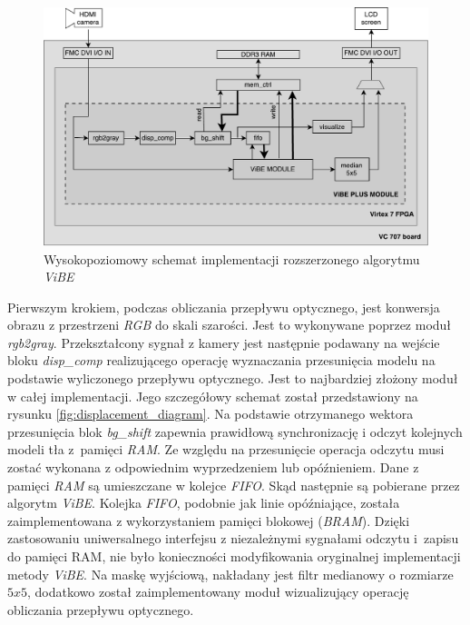 	\begin{figure}[h!]
		\centering
		\includegraphics[scale=0.6]{img/4/vibe_plus.pdf}
		\caption{Wysokopoziomowy schemat implementacji rozszerzonego algorytmu \textit{ViBE}}
		\label{fig:vibe_plus_diagram}
	\end{figure}

Pierwszym krokiem, podczas obliczania przepływu optycznego, jest konwersja obrazu z przestrzeni \textit{RGB} do skali szarości. 
Jest to wykonywane poprzez moduł \textit{rgb2gray}. 
Przekształcony sygnał z kamery jest następnie podawany na wejście bloku \textit{disp\_comp} realizującego operację wyznaczania przesunięcia modelu na podstawie wyliczonego przepływu optycznego. 
Jest to najbardziej złożony moduł w całej implementacji. 
Jego szczegółowy schemat został przedstawiony na rysunku \ref{fig:displacement_diagram}. 
Na podstawie otrzymanego wektora przesunięcia blok \textit{bg\_shift} zapewnia prawidłową synchronizację i odczyt kolejnych modeli tła z~pamięci \textit{RAM}. 
Ze względu na przesunięcie operacja odczytu musi zostać wykonana z odpowiednim wyprzedzeniem lub opóźnieniem. 
Dane z pamięci \textit{RAM} są umieszczane w kolejce \textit{FIFO}.
Skąd następnie są pobierane przez algorytm \textit{ViBE}. 
Kolejka \textit{FIFO}, podobnie jak linie opóźniające, została zaimplementowana z wykorzystaniem pamięci blokowej (\textit{BRAM}). 
Dzięki zastosowaniu uniwersalnego interfejsu z niezależnymi sygnałami odczytu i~zapisu do pamięci RAM, nie było konieczności modyfikowania oryginalnej implementacji metody \textit{ViBE}. 
Na maskę wyjściową, nakładany jest filtr medianowy o rozmiarze $5x5$, dodatkowo został zaimplementowany moduł wizualizujący operację obliczania przepływu optycznego.

